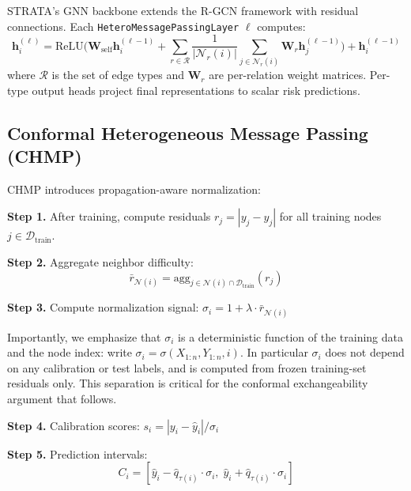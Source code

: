 \documentclass[twoside,11pt]{article}
\begin{document}
STRATA's GNN backbone extends the R-GCN framework \citep{schlichtkrull2018modeling}
with residual connections. Each \texttt{HeteroMessagePassingLayer} $\ell$ computes:
\begin{equation}
\mathbf{h}_i^{(\ell)} = \text{ReLU}\!\bigl(\mathbf{W}_{\text{self}}
\mathbf{h}_i^{(\ell-1)} + \sum_{r \in \mathcal{R}}
\frac{1}{|\mathcal{N}_r(i)|} \sum_{j \in \mathcal{N}_r(i)}
\mathbf{W}_r \mathbf{h}_j^{(\ell-1)}\bigr) + \mathbf{h}_i^{(\ell-1)}
\end{equation}
where $\mathcal{R}$ is the set of edge types and $\mathbf{W}_r$ are
per-relation weight matrices. Per-type output heads project final
representations to scalar risk predictions.

\subsection{Conformal Heterogeneous Message Passing (CHMP)}

CHMP introduces propagation-aware normalization:

\textbf{Step 1.} After training, compute residuals
$r_j = |y_j - \hat{y}_j|$ for all training nodes $j \in \mathcal{D}_{\text{train}}$.

\textbf{Step 2.} Aggregate neighbor difficulty:
\begin{equation}
\bar{r}_{\mathcal{N}(i)} = \text{agg}_{j \in \mathcal{N}(i) \cap
\mathcal{D}_{\text{train}}} (r_j)
\end{equation}

\textbf{Step 3.} Compute normalization signal:
$\sigma_i = 1 + \lambda \cdot \bar{r}_{\mathcal{N}(i)}$

Importantly, we emphasize that $\sigma_i$ is a deterministic function of the
training data and the node index: write $\sigma_i = \sigma(X_{1:n}, Y_{1:n}, i)$.
In particular $\sigma_i$ does not depend on any calibration or test labels,
and is computed from frozen training-set residuals only. This separation is
critical for the conformal exchangeability argument that follows.

\textbf{Step 4.} Calibration scores: $s_i = |y_i - \hat{y}_i| / \sigma_i$

\textbf{Step 5.} Prediction intervals:
\begin{equation}
C_i = [\hat{y}_i - \hat{q}_{\tau(i)} \cdot \sigma_i, \;
\hat{y}_i + \hat{q}_{\tau(i)} \cdot \sigma_i]
\end{equation}
\end{document}
